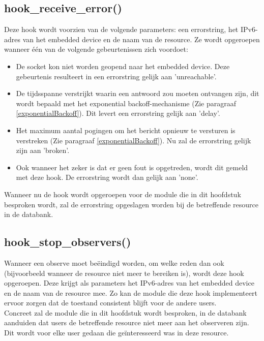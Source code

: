 \subsection{hook\_receive\_error()}
Deze hook wordt voorzien van de volgende parameters: een errorstring, het IPv6-adres van het embedded device en de naam van de resource. Ze wordt opgeroepen wanneer \'{e}\'{e}n van de volgende gebeurtenissen zich voordoet:
\begin{itemize}
\item De socket kon niet worden geopend naar het embedded device. Deze gebeurtenis resulteert in een errorstring gelijk aan 'unreachable'.
\item De tijdsspanne verstrijkt waarin een antwoord zou moeten ontvangen zijn, dit wordt bepaald met het exponential backoff-mechanisme (Zie paragraaf \ref{exponentialBackoff}). Dit levert een errorstring gelijk aan 'delay'.
\item Het maximum aantal pogingen om het bericht opnieuw te versturen is verstreken (Zie paragraaf \ref{exponentialBackoff}). Nu zal de errorstring gelijk zijn aan 'broken'.
\item Ook wanneer het zeker is dat er geen fout is opgetreden, wordt dit gemeld met deze hook. De errorstring wordt dan gelijk aan 'none'.
\end{itemize}
Wanneer nu de hook wordt opgeroepen voor de module die in dit hoofdstuk besproken wordt, zal de errorstring opgeslagen worden bij de betreffende resource in de databank.

\subsection{hook\_stop\_observers()}
Wanneer een observe moet be\"{e}indigd worden, om welke reden dan ook (bijvoorbeeld wanneer de resource niet meer te bereiken is), wordt deze hook opgeroepen. Deze krijgt als parameters het IPv6-adres van het embedded device en de naam van de resource mee. Zo kan de module die deze hook implementeert ervoor zorgen dat de toestand consistent blijft voor de andere users.\\
Concreet zal de module die in dit hoofdstuk wordt besproken, in de databank aanduiden dat users de betreffende resource niet meer aan het observeren zijn. Dit wordt voor elke user gedaan die ge\"{i}nteresseerd was in deze resource.